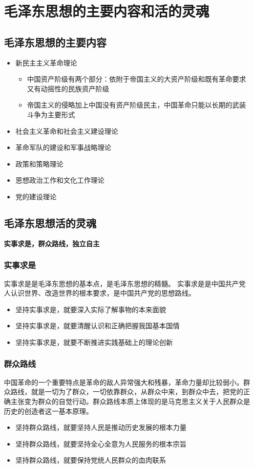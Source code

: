 \documentclass[12pt,openany]{ctexbook}
\begin{document}
\section{毛泽东思想的主要内容和活的灵魂}
\subsection{毛泽东思想的主要内容}
\begin{itemize}
  \item 新民主主义革命理论
\begin{itemize}
  \item 中国资产阶级有两个部分：依附于帝国主义的大资产阶级和既有革命要求又有动摇性的民族资产阶级
  \item 帝国主义的侵略加上中国没有资产阶级民主，中国革命只能以长期的武装斗争为主要形式
\end{itemize}
  \item 社会主义革命和社会主义建设理论
  \item 革命军队的建设和军事战略理论 
  \item 政策和策略理论 
  \item 思想政治工作和文化工作理论
  \item 党的建设理论 
\end{itemize}
\subsection{毛泽东思想活的灵魂}
\textbf{实事求是，群众路线，独立自主}
\subsubsection{实事求是}
实事求是是毛泽东思想的基本点，是毛泽东思想的精髓。 实事求是是中国共产党人认识世界、改造世界的根本要求，是中国共产党的思想路线。
\begin{itemize}
  \item 坚持实事求是，就要深入实际了解事物的本来面貌
  \item 坚持实事求是，就要清醒认识和正确把握我国基本国情
  \item 坚持实事求是，就要不断推进实践基础上的理论创新
\end{itemize}
\subsubsection{群众路线}
中国革命的一个重要特点是革命的敌人异常强大和残暴，革命力量却比较弱小。群众路线，就是一切为了群众，一切依靠群众，从群众中来，到群众中去，把党的正确主张变为群众的自觉行动。群众路线本质上体现的是马克思主义关于人民群众是历史的创造者这一基本原理。
\begin{itemize}
  \item 坚持群众路线，就要坚持人民是推动历史发展的根本力量
  \item 坚持群众路线，就要坚持全心全意为人民服务的根本宗旨
  \item 坚持群众路线，就要保持党统人民群众的血肉联系
\end{itemize}
\end{document}
